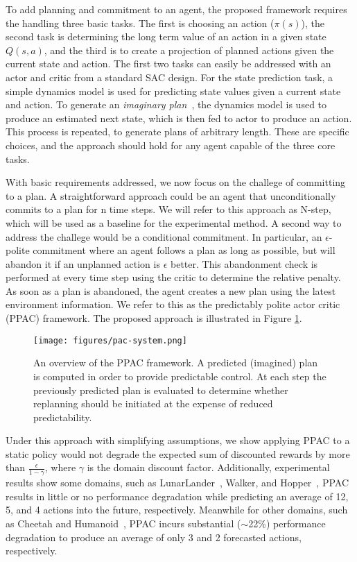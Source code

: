 \documentclass{article}
\begin{document}
        To add planning and commitment to an agent, the proposed framework requires the handling three basic tasks. The first is choosing an action (\(\pi(s)\)), the second task is determining the long term value of an action in a given state \(Q(s,a)\), and the third is to create a projection of planned actions given the current state and action. The first two tasks can easily be addressed with an actor and critic from a standard SAC design. For the state prediction task, a simple dynamics model is used for predicting state values given a current state and action. To generate an \textit{imaginary plan}~\cite{racaniere2017imagination}, the dynamics model is used to produce an estimated next state, which is then fed to actor to produce an action. This process is repeated, to generate plans of arbitrary length. These are specific choices, and the approach should hold for any agent capable of the three core tasks.
        
        With basic requirements addressed, we now focus on the challege of committing to a plan. A straightforward approach could be an agent that unconditionally commits to a plan for n time steps. We will refer to this approach as N-step, which will be used as a baseline for the experimental method. A second way to address the challege would be a conditional commitment. In particular, an $\epsilon$-polite commitment where an agent follows a plan as long as possible, but will abandon it if an unplanned action is $\epsilon$ better. This abandonment check is performed at every time step using the critic to determine the relative penalty. As soon as a plan is abandoned, the agent creates a new plan using the latest environment information. We refer to this as the predictably polite actor critic (PPAC) framework. The proposed approach is illustrated in Figure \ref{pac-system}.
        
        \begin{figure}
            \texttt{[image: figures/pac-system.png]}
            \caption{An overview of the PPAC framework. A predicted (imagined) plan is computed in order to provide predictable control. At each step the previously predicted plan is evaluated to determine whether replanning should be initiated at the expense of reduced predictability.}
            \label{pac-system}
        \end{figure}
        
        Under this approach with simplifying assumptions, we show applying PPAC to a static policy would not degrade the expected sum of discounted rewards by more than $\frac{\epsilon}{1-\gamma}$, where $\gamma$ is the domain discount factor. Additionally, experimental results show some domains, such as LunarLander~\cite{gym}, Walker, and Hopper~\cite{pybullet}, PPAC results in little or no performance degradation while predicting an average of 12, 5, and 4 actions into the future, respectively. Meanwhile for other domains, such as Cheetah and Humanoid~\cite{pybullet}, PPAC incurs substantial ($\sim$22\%) performance degradation to produce an average of only 3 and 2 forecasted actions, respectively.
        
\end{document}
